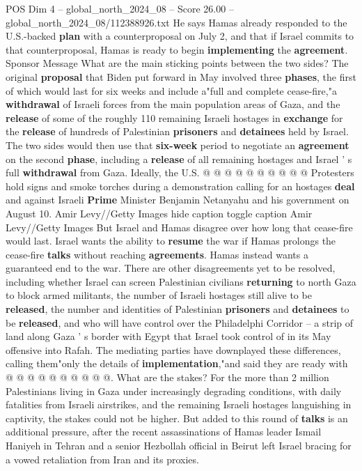 \begin{textsample}{POS Dim 4 – global\_north\_2024\_08 – Score 26.00 – global\_north\_2024\_08/112388926.txt}
He says Hamas already responded to the U.S.-backed \textbf{plan} with a counterproposal on July 2, and that if Israel commits to that counterproposal, Hamas is ready to begin \textbf{implementing} the \textbf{agreement}.
Sponsor Message What are the main sticking points between the two sides?
The original \textbf{proposal} that Biden put forward in May involved three \textbf{phases}, the first of which would last for six weeks and include a"full and complete cease-fire,"a \textbf{withdrawal} of Israeli forces from the main population areas of Gaza, and the \textbf{release} of some of the roughly 110 remaining Israeli hostages in \textbf{exchange} for the \textbf{release} of hundreds of Palestinian \textbf{prisoners} and \textbf{detainees} held by Israel.
The two sides would then use that \textbf{six-week} period to negotiate an \textbf{agreement} on the second \textbf{phase}, including a \textbf{release} of all remaining hostages and Israel ' s full \textbf{withdrawal} from Gaza.
Ideally, the U.S. @ @ @ @ @ @ @ @ @ @ Protesters hold signs and smoke torches during a demonstration calling for an hostages \textbf{deal} and against Israeli \textbf{Prime} Minister Benjamin Netanyahu and his government on August 10.
Amir Levy//Getty Images hide caption toggle caption Amir Levy//Getty Images But Israel and Hamas disagree over how long that cease-fire would last.
Israel wants the ability to \textbf{resume} the war if Hamas prolongs the cease-fire \textbf{talks} without reaching \textbf{agreements}.
Hamas instead wants a guaranteed end to the war.
There are other disagreements yet to be resolved, including whether Israel can screen Palestinian civilians \textbf{returning} to north Gaza to block armed militants, the number of Israeli hostages still alive to be \textbf{released}, the number and identities of Palestinian \textbf{prisoners} and \textbf{detainees} to be \textbf{released}, and who will have control over the Philadelphi Corridor -- a strip of land along Gaza ' s border with Egypt that Israel took control of in its May offensive into Rafah.
The mediating parties have downplayed these differences, calling them"only the details of \textbf{implementation},"and said they are ready with @ @ @ @ @ @ @ @ @ @.
What are the stakes?
For the more than 2 million Palestinians living in Gaza under increasingly degrading conditions, with daily fatalities from Israeli airstrikes, and the remaining Israeli hostages languishing in captivity, the stakes could not be higher.
But added to this round of \textbf{talks} is an additional pressure, after the recent assassinations of Hamas leader Ismail Haniyeh in Tehran and a senior Hezbollah official in Beirut left Israel bracing for a vowed retaliation from Iran and its proxies.

\end{textsample}
